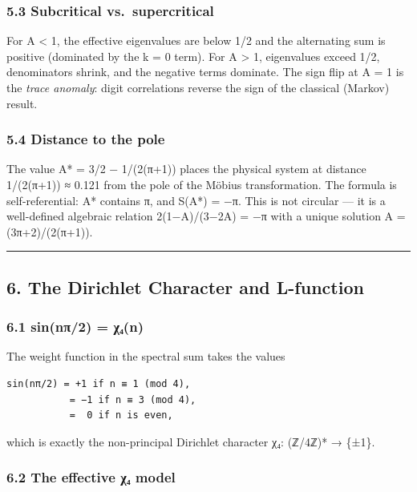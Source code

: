 \documentclass[
  11pt,
]{article}
\begin{document}
\subsubsection{5.3 Subcritical
vs.~supercritical}\label{subcritical-vs.-supercritical}

For A \textless{} 1, the effective eigenvalues are below 1/2 and the alternating
sum is positive (dominated by the k = 0 term). For A \textgreater{} 1,
eigenvalues exceed 1/2, denominators shrink, and the negative terms dominate.
The sign flip at A = 1 is the \emph{trace anomaly}: digit correlations reverse
the sign of the classical (Markov) result.

\subsubsection{5.4 Distance to the pole}\label{distance-to-the-pole}

The value A* = 3/2 − 1/(2(π+1)) places the physical system at distance
1/(2(π+1)) ≈ 0.121 from the pole of the Möbius transformation. The formula is
self-referential: A* contains π, and S(A*) = −π. This is not circular --- it is
a well-defined algebraic relation 2(1−A)/(3−2A) = −π with a unique solution A =
(3π+2)/(2(π+1)).

\begin{center}\rule{0.5\linewidth}{0.5pt}\end{center}

\newpage

\subsection{6. The Dirichlet Character and
L-function}\label{the-dirichlet-character-and-l-function}

\subsubsection{6.1 sin(nπ/2) = χ₄(n)}\label{sinnux3c02-ux3c7ux2084n}

The weight function in the spectral sum takes the values

\begin{verbatim}
sin(nπ/2) = +1 if n ≡ 1 (mod 4),
           = −1 if n ≡ 3 (mod 4),
           =  0 if n is even,
\end{verbatim}

which is exactly the non-principal Dirichlet character χ₄: (ℤ/4ℤ)* → \{±1\}.

\subsubsection{6.2 The effective χ₄
model}\label{the-effective-ux3c7ux2084-model}
\end{document}
